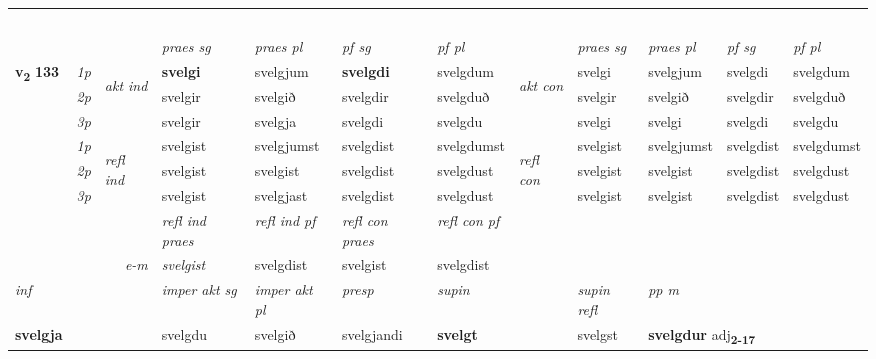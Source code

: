 \begin{longtable}[l]{X>{\footnotesize\itshape}llXXXXlXXXX}
\midrule
 & \\*
  & \\*
   & \\*
   & \\*
  & \\
   \midrule
 & &   & \textit{praes sg}  & \textit{praes pl}    & \textit{ pf sg} & \textit{pf pl} & & \textit{praes sg}  & \textit{praes pl}    & \textit{pf sg} & \textit{pf pl }  \\ \cmidrule{4-7} \cmidrule{9-12}
 \multirow{2}{*}{{{\textbf{v{\textsubscript{2}}} \Large{\textbf{133}}}}}  & 1p & \multirow{3}{*}{\begin{turn}{90}\textit{akt ind}\end{turn}} & \textbf{svelgi} & svelgjum & \textbf{svelgdi} & svelgdum & \multirow{3}{*}{\begin{turn}{90}\textit{akt con}\end{turn}} &svelgi & svelgjum & svelgdi & svelgdum\\*
 & 2p &  &  svelgir  & svelgið & svelgdir & svelgduð & & svelgir & svelgið & svelgdir & svelgduð \\*
 & 3p &  & svelgir & svelgja & svelgdi & svelgdu & & svelgi & svelgi& svelgdi & svelgdu \\*
\cmidrule{4-7} \cmidrule{9-12}
 & 1p & \multirow{3}{*}{\begin{turn}{90}\textit{refl ind}\end{turn}}  & svelgist & svelgjumst & svelgdist & svelgdumst & \multirow{3}{*}{\begin{turn}{90}\textit{refl con}\end{turn}}  &svelgist & svelgjumst & svelgdist & svelgdumst \\*
 & 2p &  & svelgist & svelgist & svelgdist & svelgdust & &svelgist & svelgist & svelgdist & svelgdust \\*
 & 3p  & & svelgist & svelgjast & svelgdist & svelgdust & & svelgist & svelgist& svelgdist & svelgdust \\*
\cmidrule{4-7} \cmidrule{9-12}

 & && \textit{refl ind praes} & \textit{refl ind pf} & \textit{refl con praes} & \textit{refl con pf} \\*
\multicolumn{3}{r}{\textit{e-m}}& svelgist & svelgdist & svelgist & svelgdist \\*

\cmidrule{4-7}
   {\textit{inf}} & &  & \textit{imper akt sg} & \textit{imper akt pl}   & \textit{presp} & \textit{supin} && \textit{supin refl} & \textit{pp m} \\*
  {\textbf{svelgja}} & && svelgdu  & svelgið   & svelgjandi &  \textbf{svelgt} && svelgst & \multicolumn{2}{l}{\textbf{svelgdur} adj\textbf{\textsubscript{2-17}}} \\*


\end{longtable}
